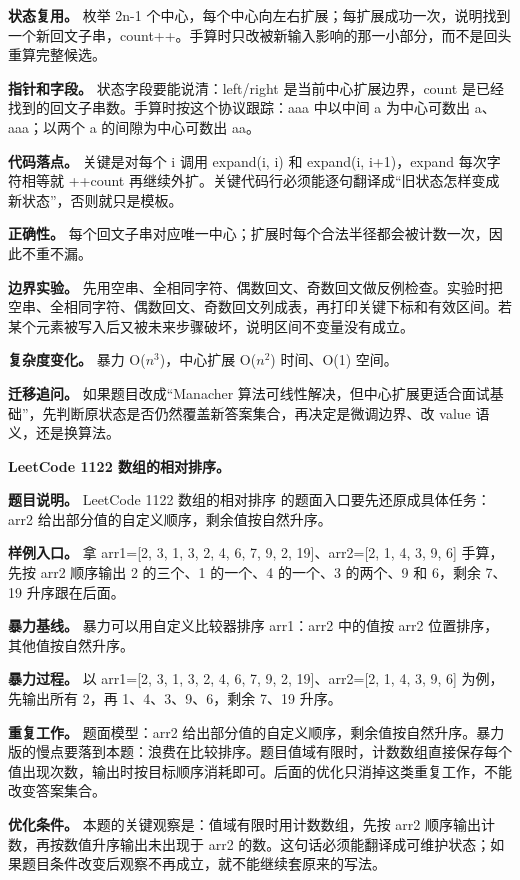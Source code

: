 \textbf{状态复用。} 枚举 2n-1 个中心，每个中心向左右扩展；每扩展成功一次，说明找到一个新回文子串，count++。手算时只改被新输入影响的那一小部分，而不是回头重算完整候选。

\textbf{指针和字段。} 状态字段要能说清：left/right 是当前中心扩展边界，count 是已经找到的回文子串数。手算时按这个协议跟踪：aaa 中以中间 a 为中心可数出 a、aaa；以两个 a 的间隙为中心可数出 aa。

\textbf{代码落点。} 关键是对每个 i 调用 expand(i, i) 和 expand(i, i+1)，expand 每次字符相等就 ++count 再继续外扩。关键代码行必须能逐句翻译成“旧状态怎样变成新状态”，否则就只是模板。

\textbf{正确性。} 每个回文子串对应唯一中心；扩展时每个合法半径都会被计数一次，因此不重不漏。

\textbf{边界实验。} 先用空串、全相同字符、偶数回文、奇数回文做反例检查。实验时把空串、全相同字符、偶数回文、奇数回文列成表，再打印关键下标和有效区间。若某个元素被写入后又被未来步骤破坏，说明区间不变量没有成立。

\textbf{复杂度变化。} 暴力 O(\ensuremath{n^{3}})，中心扩展 O(\ensuremath{n^{2}}) 时间、O(1) 空间。

\textbf{迁移追问。} 如果题目改成“Manacher 算法可线性解决，但中心扩展更适合面试基础”，先判断原状态是否仍然覆盖新答案集合，再决定是微调边界、改 value 语义，还是换算法。

\noindent\textbf{LeetCode 1122 数组的相对排序。}

\textbf{题目说明。} LeetCode 1122 数组的相对排序 的题面入口要先还原成具体任务：arr2 给出部分值的自定义顺序，剩余值按自然升序。

\textbf{样例入口。} 拿 arr1=[2, 3, 1, 3, 2, 4, 6, 7, 9, 2, 19]、arr2=[2, 1, 4, 3, 9, 6] 手算，先按 arr2 顺序输出 2 的三个、1 的一个、4 的一个、3 的两个、9 和 6，剩余 7、19 升序跟在后面。

\textbf{暴力基线。} 暴力可以用自定义比较器排序 arr1：arr2 中的值按 arr2 位置排序，其他值按自然升序。

\textbf{暴力过程。} 以 arr1=[2, 3, 1, 3, 2, 4, 6, 7, 9, 2, 19]、arr2=[2, 1, 4, 3, 9, 6] 为例，先输出所有 2，再 1、4、3、9、6，剩余 7、19 升序。

\textbf{重复工作。} 题面模型：arr2 给出部分值的自定义顺序，剩余值按自然升序。暴力版的慢点要落到本题：浪费在比较排序。题目值域有限时，计数数组直接保存每个值出现次数，输出时按目标顺序消耗即可。后面的优化只消掉这类重复工作，不能改变答案集合。

\textbf{优化条件。} 本题的关键观察是：值域有限时用计数数组，先按 arr2 顺序输出计数，再按数值升序输出未出现于 arr2 的数。这句话必须能翻译成可维护状态；如果题目条件改变后观察不再成立，就不能继续套原来的写法。


